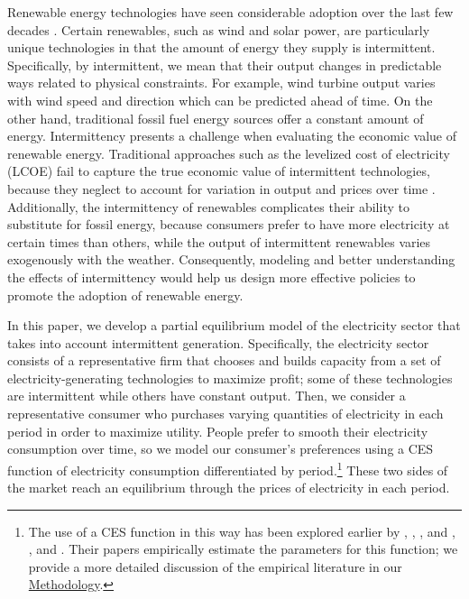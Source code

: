 \documentclass[11pt,a4paper,leqno]{extarticle}
\begin{document}
	
	Renewable energy technologies have seen considerable adoption over the last few decades \citep{EIArenew}. Certain renewables, such as wind and solar power, are particularly unique technologies in that the amount of energy they supply is intermittent. Specifically, by intermittent, we mean that their output changes in predictable ways related to physical constraints. For example, wind turbine output varies with wind speed and direction which can be predicted ahead of time. On the other hand, traditional fossil fuel energy sources offer a constant amount of energy. Intermittency presents a challenge when evaluating the economic value of renewable energy. Traditional approaches such as the levelized cost of electricity (LCOE) fail to capture the true economic value of intermittent technologies, because they neglect to account for variation in output and prices over time \citep{Joskow2011}. Additionally, the intermittency of renewables complicates their ability to substitute for fossil energy, because consumers prefer to have more electricity at certain times than others, while the output of intermittent renewables varies exogenously with the weather. Consequently, modeling and better understanding the effects of intermittency  would help us design more effective policies to promote the adoption of renewable energy. 
	
	
	In this paper, we develop a partial equilibrium model of the electricity sector that takes into account intermittent generation. Specifically, the electricity sector consists of a representative firm that chooses and builds capacity from a set of electricity-generating technologies to maximize profit; some of these technologies are intermittent while others have constant output. Then, we consider a representative consumer who purchases varying quantities of electricity in each period in order to maximize utility. People prefer to smooth their electricity consumption over time, so we model our consumer's preferences using a CES function of electricity consumption differentiated by period.\footnote{ The use of a CES function in this way has been explored earlier by \citet{Schwarz}, \citet{Schwarz}, \citet{Herriges}, and \citet{KS1994}, \citet{Aubin}, and \citet{Moha2016}. Their papers empirically estimate the parameters for this function; we provide a more detailed discussion of the empirical literature in our \hyperref[sec:methodology]{Methodology}.} These two sides of the market reach an equilibrium through the prices of electricity in each period. 
	
\end{document}
